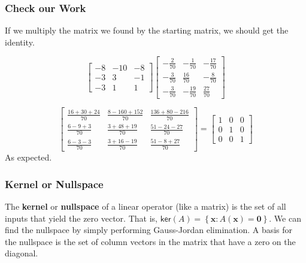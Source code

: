 \documentclass[10pt]{beamer}
\begin{document}
\begin{frame}
  \frametitle{Check our Work}

  If we multiply the matrix we found by the starting matrix, we should get the identity.

  $$\left[\begin{matrix}
      -8 & -10 & -8\\
      -3 & 3 & -1\\
      -3 & 1 & 1
    \end{matrix}\right]\left[\begin{matrix}
      -\frac{2}{70} & -\frac{1}{70} & -\frac{17}{70}\\
      -\frac{3}{70} & \frac{16}{70} & -\frac{8}{70}\\
      -\frac{3}{70} & -\frac{19}{70} & \frac{27}{70}
    \end{matrix}\right]$$

  $$\left[\begin{matrix}
      \frac{16 + 30 + 24}{70} & \frac{8 - 160 + 152}{70} & \frac{136 + 80 - 216}{70}\\
      \frac{6 - 9 + 3}{70} & \frac{3 + 48 + 19}{70} & \frac{51 - 24 - 27}{70}\\
      \frac{6 - 3 - 3}{70} & \frac{3 + 16 - 19}{70} & \frac{51 - 8 + 27}{70}
    \end{matrix}\right] = \left[\begin{matrix}
      1 & 0 & 0\\
      0 & 1 & 0\\
      0 & 0 & 1
    \end{matrix}\right]$$
  As expected.
\end{frame}

\begin{frame}
  \frametitle{Kernel or Nullspace}
  The \textbf{kernel} or \textbf{nullspace} of a linear operator (like a matrix) is the set of all inputs that yield the zero vector. That is, $\mathsf{ker}(A) = \left\{\mathbf{x} : A(\mathbf{x}) = \mathbf{0}\right\}$. We can find the nullspace by simply performing Gauss-Jordan elimination. A basis for the nullspace is the set of column vectors in the matrix that have a zero on the diagonal.
\end{frame}
\end{document}
